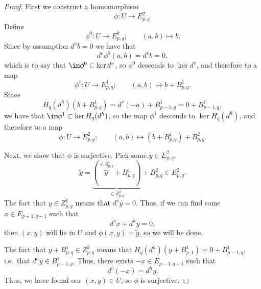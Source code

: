 \documentclass[main.tex]{subfiles}
\begin{document}
\begin{proof}
  First we construct a homomorphism
  \begin{equation*}
    \phi\colon U \to E^{2}_{p, q}.
  \end{equation*}
  Define
  \begin{equation*}
    \phi^{0}\colon U \to E^{0}_{p, q};\qquad (a, b) \mapsto b.
  \end{equation*}
  Since by assumption $d^{v}b = 0$ we have that
  \begin{equation*}
    d^{v}\phi^{0}(a, b) = d^{v}b = 0,
  \end{equation*}
  which is to say that $\im \phi^{0} \subset \ker d^{v}$, so $\phi^{0}$ descends to $\ker d^{v}$, and therefore to a map
  \begin{equation*}
    \phi^{1}\colon U \to E^{1}_{p,q};\qquad (a, b) \mapsto b + B^{1}_{p, q}.
  \end{equation*}
  Since
  \begin{equation*}
    H_{q}(d^{h})(b + B^{1}_{p, q}) = d^{v}(-a) + B^{1}_{p-1, q} = 0 + B^{1}_{p-1, q},
  \end{equation*}
  we have that $\im \phi^{1} \subset \ker H_{q}(d^{h})$, so the map $\phi^{1}$ descends to $\ker H_{q}(d^{h})$, and therefore to a map
  \begin{equation*}
    \phi\colon U \to E^{2}_{p, q};\qquad (a, b) \mapsto (b + B^{1}_{p, q}) + B^{2}_{p, q}.
  \end{equation*}

  Next, we show that $\phi$ is surjective. Pick some $\tilde{y} \in E^{2}_{p, q}$. 
  \begin{equation*}
    \tilde{y} = \underbrace{(\overbrace{y}^{\in Z^{1}_{p, q}} + B^{1}_{p, q})}_{\in Z^{2}_{p, q}} + B^{2}_{p, q} \in E^{2}_{p, q}.
  \end{equation*}
  The fact that $y \in Z^{1}_{p, q}$ means that $d^{v}y = 0$. Thus, if we can find some $x \in E_{p+1, q-1}$ such that
  \begin{equation*}
    d^{v}x + d^{h}y = 0,
  \end{equation*}
  then $(x, y)$ will lie in $U$ and $\phi(x, y) = \tilde{y}$, so we will be done.

  The fact that $y + B^{1}_{p, q} \in Z^{2}_{p, q}$ means that $H_{q}(d^{h})(y + B^{1}_{p, 1}) = 0 + B^{1}_{p-1, q}$, i.e.\ that $d^{h} y \in B^{1}_{p-1,q}$. Thus, there exists $-x \in E_{p-1, q+1}$ such that
  \begin{equation*}
    d^{v}(-x) = d^{h}y.
  \end{equation*}
  Thus, we have found our $(x, y) \in U$, so $\phi$ is surjective.


\end{proof}
\end{document}
